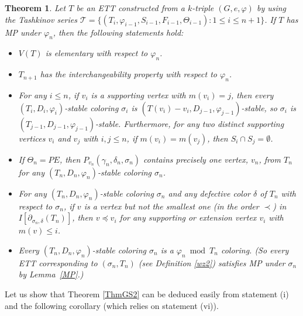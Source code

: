 \documentclass[11pt]{article}
\newtheorem{theorem}{Theorem}[section]
\newcommand{\TT}{\mathcal {T}}
\newcommand{\phiv}{\varphi}
\begin{document}
\begin{theorem} \label{thm:tech10}
	Let $T$ be an ETT constructed from a $k$-triple $(G,e, \varphi)$ by using the Tashkinov series 
	$\TT=\{(T_i, \phiv_{i-1}, S_{i-1}, F_{i-1}, \Theta_{i-1}): 1\le i \le n+1\}$. If $T$ has 
	MP under $\varphi_n$, then the following statements hold:
	\begin{itemize}
		\vspace{-1.2mm}
		\item[(i)] $V(T)$ is elementary with respect to $\phiv_n$.
		\vspace{-2mm}
		\item[(ii)] $T_{n+1}$ has the interchangeability property with respect to $\varphi_n$.
		\vspace{-2mm}
		\item[(iii)] For any $i \le n$,  if $v_i$ is a supporting vertex with $m(v_i) =j$, then every $(T_i, D_i, \varphi_i)$-stable 
		coloring $\sigma_i$ is $(T(v_i)-v_i, D_{j-1},\varphi_{j-1})$-stable, so $\sigma_i$ is $(T_{j-1},D_{j-1},\varphi_{j-1})$-stable. 
		Furthermore, for any two distinct supporting 		vertices $v_i$ and $v_j$ with $i,j \le n$,  if $m(v_i)=m(v_j)$, then $S_i \cap S_j=\emptyset$.
		\vspace{-2mm}
		\item[(iv)] If $\Theta_n = PE$, then $P_{v_n}(\gamma_n, \delta_n, \sigma_n)$ contains precisely one vertex,
		$v_n$, from $T_n$ for any $(T_n, D_n, \phiv_n)$-stable coloring $\sigma_n$.
		\vspace{-2mm}
		\item[(v)] For any $(T_n, D_n, \phiv_n)$-stable coloring $\sigma_n$ and any defective color $\delta$ of $T_n$ 
		with respect to $\sigma_n$, if $v$ is a vertex but not the smallest one (in the order $\prec$)  
		in $I[\partial_{\sigma_n, \delta}(T_n)]$, then $v \preceq v_i$ for any supporting or extension vertex  
		$v_i$ with $m(v) \le i$.
		\vspace{-2mm} 
		\item[(vi)] Every $(T_n,D_n,\varphi_n)$-stable coloring $\sigma_n$ is a $\phiv_n\bmod T_n$ coloring. (So
		every ETT corresponding to $(\sigma_n, T_n)$ (see Definition \ref{wz2}) satisfies 
		MP under $\sigma_n$ by Lemma~\ref{MP}.)
	\end{itemize}
\end{theorem}
\vskip 1mm

Let us show that Theorem \ref{ThmGS2} can be deduced easily from statement (i) and the following corollary (which relies on statement (vi)).  
\end{document}
